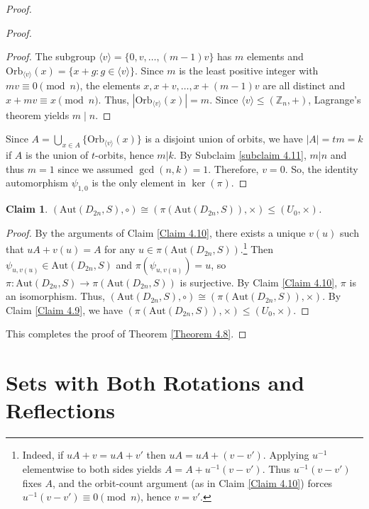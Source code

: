 \documentclass[12pt,reqno,a4paper]{amsart}
\theoremstyle{definition}
\newtheorem{claim}[defn]{Claim}
\begin{document}
\begin{proof}
\begin{proof}
\begin{proof}
The subgroup $\langle v\rangle=\{0,v,\dots,(m-1)v\}$ has $m$ elements and
$\mathrm{Orb}_{\langle v\rangle}(x)=\{x + g : g\in \langle v\rangle\}$.
Since $m$ is the least positive integer with $m v\equiv 0\pmod n$, the elements $x, x+v,\dots,x+(m-1)v$ are all distinct and
$x + m v \equiv x \pmod n$.
Thus, $|\mathrm{Orb}_{\langle v\rangle}(x)|=m$.
Since $\langle v\rangle\leq (\mathbb Z_n,+)$, Lagrange's theorem yields $m\mid n$.
 \end{proof}

Since $A=\bigcup_{x\in A} \{\mathrm{Orb}_{\langle v\rangle}(x)\}$ is a disjoint union of orbits, we have $|A|=tm=k$ if $A$ is the union of $t$-orbits, hence $m|k$. By Subclaim \ref{subclaim 4.11}, $m|n$ and thus $m=1$ since we assumed $\gcd (n,k)=1$. Therefore, $v=0$. So, the identity automorphism $\psi_{1,0}$ is the only element in $\ker(\pi)$.
 \end{proof}

\begin{claim}\label{Claim 4.12}
    {\em $(\mathrm{Aut}(D_{2n},S),\circ) \cong (\pi(\mathrm{Aut}(D_{2n},S)),\times)\leq (U_{0},\times)$.}
\end{claim}

\begin{proof}
By the arguments of Claim \ref{Claim 4.10}, there exists a unique $v(u)$ such that $uA + v(u) = A$ for any $u \in \pi(\mathrm{Aut}(D_{2n},S))$.\footnote{Indeed, if $uA+v=uA+v'$ then $uA = uA + (v-v')$. Applying $u^{-1}$ elementwise to both sides yields
$A = A + u^{-1}(v-v')$. Thus $u^{-1}(v-v')$ fixes $A$, and the orbit-count argument (as in Claim \ref{Claim 4.10}) forces $u^{-1}(v-v')\equiv 0\pmod n$, hence $v=v'$.}
Then $\psi_{u,v(u)} \in \mathrm{Aut}(D_{2n},S)$ and $\pi(\psi_{u,v(u)}) = u$, so $\pi: \mathrm{Aut}(D_{2n},S)\rightarrow \pi(\mathrm{Aut}(D_{2n},S))$ is surjective. By Claim \ref{Claim 4.10}, $\pi$ is an isomorphism.
Thus, 
$(\mathrm{Aut}(D_{2n},S),\circ) \cong (\pi(\mathrm{Aut}(D_{2n},S)),\times)$.
By Claim \ref{Claim 4.9}, we have $(\pi(\mathrm{Aut}(D_{2n},S)),\times)\leq (U_{0},\times)$.
 \end{proof}
This completes the proof of Theorem \ref{Theorem 4.8}.
 \end{proof}


\section{Sets with Both Rotations and Reflections}
\end{document}

